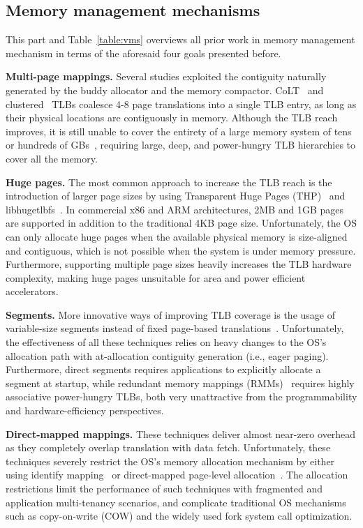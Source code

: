 \subsection{Memory management mechanisms}

This part and Table~\ref{table:vms} overviews all prior work in memory management mechanism in terms of the aforesaid four goals presented before. 

\noindent\textbf{Multi-page mappings.} Several studies exploited
the contiguity naturally generated by the buddy allocator and the
memory compactor. CoLT~\cite{pham:colt} and clustered~\cite{pham:increasing} TLBs coalesce 4-8 page translations into a single TLB entry, as long as their physical locations are contiguously in memory. Although the TLB reach improves, it is still unable to cover the entirety of a large memory system of tens or hundreds of GBs~\cite{gandhi:range}, requiring large, deep, and power-hungry TLB hierarchies to cover all the memory. 

\noindent\textbf{Huge pages.} The most common approach to increase the TLB reach is the introduction of larger page sizes by using Transparent Huge Pages (THP)~\cite{transparenthugepages} and libhugetlbfs~\cite{lighugetlbfs}. In commercial x86 and ARM architectures, 2MB and 1GB pages are supported in addition to the traditional 4KB page size. Unfortunately, the OS can only allocate huge pages when the available physical memory is size-aligned and contiguous, which is not possible when the system is under memory pressure. Furthermore, supporting multiple page sizes heavily increases the TLB hardware complexity, making huge pages unsuitable for area and power efficient accelerators.

\noindent\textbf{Segments.} More innovative ways of improving TLB coverage is the usage of variable-size segments instead of fixed page-based translations~\cite{karakostas:redundant, park:hybrid, basu:efficient}. Unfortunately, the effectiveness of all these techniques relies on heavy changes to the OS's allocation path with at-allocation contiguity generation (i.e., eager paging). Furthermore, direct segments requires applications to explicitly allocate a segment at startup, while redundant memory mappings (RMMs)~\cite{karakostas:redundant} requires highly associative power-hungry TLBs, both very unattractive from the programmability and hardware-efficiency perspectives. 

\noindent\textbf{Direct-mapped mappings.} These techniques deliver almost near-zero overhead as they completely overlap translation with data fetch. Unfortunately, these techniques severely restrict the OS's memory allocation mechanism by either using identify mapping~\cite{haria:devirtualizing} or direct-mapped page-level allocation~\cite{picorel:near-memory}. The allocation restrictions limit the performance of such techniques with fragmented and application multi-tenancy scenarios, and complicate traditional OS mechanisms such as copy-on-write (COW) and the widely used fork system call optimization.

